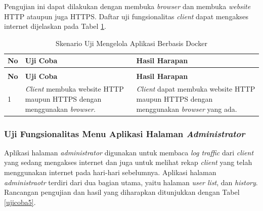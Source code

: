 Pengujian ini dapat dilakukan dengan membuka \textit{browser} dan membuka \textit{website} HTTP ataupun juga HTTPS. Daftar uji fungsionalitas \textit{client} dapat mengakses internet dijelaskan pada Tabel \ref{ujicoba4}.
\begin{longtable}{|p{}|p{}|p{}|}					\caption{Skenario Uji \textit{Client} dapat Mengakses Internet} \label{ujicoba4} \\
	\hline
	\textbf{No} & \textbf{Uji Coba} & \textbf{Hasil Harapan} \\ \hline
	\endfirsthead
	\caption[]{Skenario Uji Mengelola Aplikasi Berbasis Docker} \\
	\hline
	\textbf{No} & \textbf{Uji Coba} & \textbf{Hasil Harapan} \\ \hline
	\endhead
	\endfoot
	\endlastfoot
	
	1 & \textit{Client} membuka website HTTP maupun HTTPS dengan menggunakan \textit{browser}. & \textit{Client} dapat membuka website HTTP maupun HTTPS dengan menggunakan \textit{browser} yang ada.\\ \hline
\end{longtable}

\subsubsection{Uji Fungsionalitas Menu Aplikasi Halaman \textit{Administrator}}
Aplikasi halaman \textit{administrator} digunakan untuk membaca \textit{log traffic} dari \textit{client} yang sedang mengakses internet dan juga untuk melihat rekap \textit{client} yang telah menggunakan internet pada hari-hari sebelumnya. Aplikasi halaman \textit{administraotr} terdiri dari dua bagian utama, yaitu halaman \textit{user list}, dan \textit{history}. Rancangan pengujian dan hasil yang diharapkan ditunjukkan dengan Tabel \ref{ujicoba5}.


